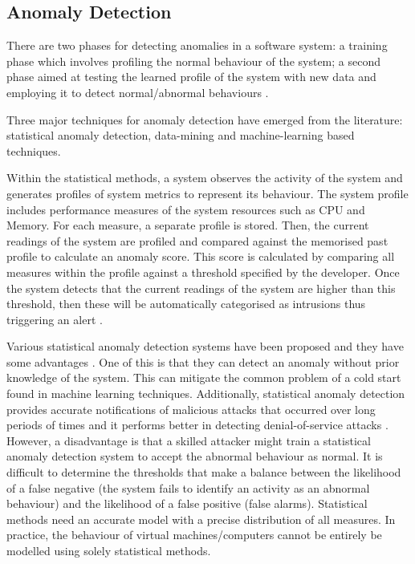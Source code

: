 \subsection{Anomaly Detection}

There are two phases for detecting anomalies in a software system: a training phase which involves profiling the normal behaviour of the system; a second phase aimed at testing the learned profile of the system with new data and employing it to detect normal/abnormal behaviours \cite{Patcha:2007hja}. 

Three major techniques for anomaly detection have emerged from the literature: statistical anomaly detection, data-mining and machine-learning based techniques. 

Within the statistical methods, a system observes the activity of the system and generates profiles of  system metrics to represent its behaviour. The system profile includes performance measures of the system resources such as CPU and Memory. For each measure, a separate profile is stored. Then, the current readings of the system are profiled and compared against the memorised past profile to calculate an anomaly score. This score is calculated by comparing all measures within the profile against a threshold specified by the developer. Once the system detects that the current readings of the system  are higher than this threshold, then these will be automatically categorised as  intrusions thus triggering an alert \cite{kruegel2003anomaly}. 

Various statistical anomaly detection systems have been proposed and they have some advantages \cite{anderson1995next,roesch1999snort}. 
One of this is that they can detect an anomaly without prior knowledge of the system. This can mitigate the common problem of a cold start found in machine learning techniques. Additionally, statistical anomaly detection provides accurate notifications of malicious attacks that occurred over long periods of times and it performs better in detecting denial-of-service attacks \cite{Patcha:2007hja}. 
However, a disadvantage is that a skilled attacker might train a statistical anomaly detection system to accept the abnormal behaviour as normal. It is difficult to determine the thresholds that make a balance between the likelihood of a false negative (the system fails to identify an activity as an abnormal behaviour) and the likelihood of a false positive (false alarms). Statistical methods need an accurate  model with a precise distribution of all measures. In practice, the behaviour of virtual machines/computers cannot be entirely be modelled using solely statistical methods.

